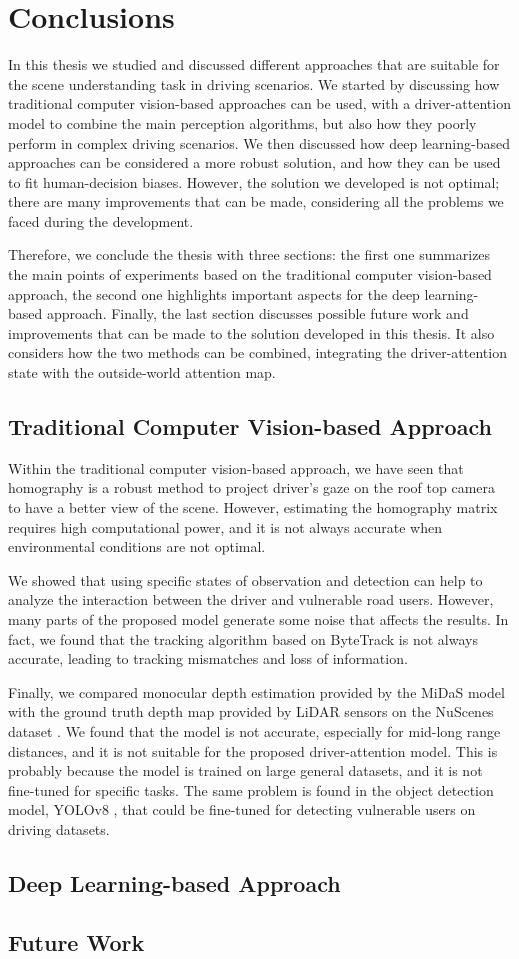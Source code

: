 \chapter{Conclusions}
\label{chpt:conclusion}

In this thesis we studied and discussed different approaches that are suitable 
for the scene understanding task in driving scenarios. 
We started by discussing how traditional 
computer vision-based approaches can be used, with a driver-attention model to 
combine the main perception algorithms, but also how they poorly perform in complex 
driving scenarios.
We then discussed how deep learning-based approaches can be considered a more 
robust solution, and how they can be used to fit human-decision biases.
However, the solution we developed is not optimal; there are many improvements 
that can be made, considering all the problems we faced during the development.

Therefore, we conclude the thesis with three sections: the first one 
summarizes the main points of experiments based on the traditional computer 
vision-based approach, the second one highlights important aspects for 
the deep learning-based approach. Finally, the last section discusses 
possible future work and improvements that can be made to the solution 
developed in this thesis. It also considers how the two methods can be 
combined, integrating the driver-attention state with the outside-world 
attention map.

\section{Traditional Computer Vision-based Approach}
Within the traditional computer vision-based approach, we have seen that 
homography is a robust method to project driver's gaze on the roof top camera 
to have a better view of the scene. However, estimating the homography matrix 
requires high computational power, and it is not always accurate when 
environmental conditions are not optimal.

We showed that using specific states of observation and detection can help to 
analyze the interaction between the driver and vulnerable road users. However, 
many parts of the proposed model generate some noise that affects the results. 
In fact, we found that the tracking algorithm based on ByteTrack \cite{bytetrack}
is not always accurate, leading to tracking mismatches and loss of information.

Finally, we compared monocular depth estimation provided by the MiDaS model 
\cite{midas} with the ground truth depth map provided by LiDAR sensors on the 
NuScenes dataset \cite{nuscenes}. We found that the model is not accurate, 
especially for mid-long range distances, and it is not suitable for the 
proposed driver-attention model. This is probably because the model is trained 
on large general datasets, and it is not fine-tuned for specific tasks.
The same problem is found in the object detection model, YOLOv8 \cite{yolo}, that 
could be fine-tuned for detecting vulnerable users on driving datasets.

\section{Deep Learning-based Approach}


\section{Future Work}